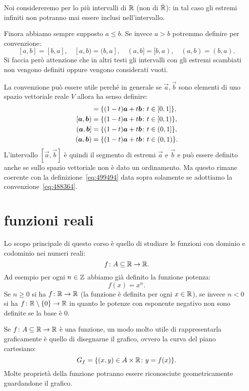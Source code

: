 Noi considereremo per lo più intervalli di $\mathbb R$ (non di $\bar {\mathbb R}$): in tal
caso gli estremi infiniti non potranno mai essere inclusi nell'intervallo.

Finora abbiamo sempre supposto $a \le b$.
Se invece $a>b$ potremmo definire per convenzione:
\begin{equation}\label{eq:488364}
  [a,b] = [b,a], \quad
  [a,b) = (b,a], \quad
  (a,b] = [b,a), \quad
  (a,b) = (b,a).
\end{equation}
Si faccia però attenzione che in altri testi gli intervalli con gli estremi
scambiati non vengono definiti oppure vengono considerati vuoti.

La convenzione può essere utile perché in generale se $\vec a, \vec b$ sono
elementi di uno spazio vettoriale reale $V$ allora ha senso
definire:
\begin{align*}
    [\vec a,\vec b] &= \ENCLOSE{(1-t)\vec a + t \vec b\colon t\in [0,1]},\\
    [\vec a,\vec b) &= \ENCLOSE{(1-t)\vec a + t \vec b\colon t\in [0,1)},\\
    (\vec a,\vec b] &= \ENCLOSE{(1-t)\vec a + t \vec b\colon t\in (0,1]},\\
    (\vec a,\vec b) &= \ENCLOSE{(1-t)\vec a + t \vec b\colon t\in (0,1)}.
\end{align*}
L'intervallo $[\vec a,\vec b]$ è quindi il segmento di estremi
$\vec a$ e $\vec b$ e può essere definito anche se sullo spazio
vettoriale non è dato un ordinamento.
Ma questo rimane coerente con la definizione~\eqref{eq:499494}
data sopra solamente se adottiamo la convenzione~\eqref{eq:488364}.


\section{funzioni reali}

Lo scopo principale di questo corso è quello di studiare le
funzioni con dominio e codominio nei numeri reali:
\[
  f \colon A \subseteq \mathbb R \to \mathbb R.
\]
Ad esempio per ogni $n\in \mathbb Z$ abbiamo già definito la funzione
potenza:
\[
  f(x) = x^n.
\]
Se $n\ge 0$ si ha $f\colon \mathbb R \to \mathbb R$ (la funzione è definita
per ogni $x\in \mathbb R$), se invece $n<0$ si ha
$f\colon \mathbb R\setminus{\left\{ 0 \right\}}\to \mathbb R$ in quanto le potenze
con esponente negativo non sono definite se la base è $0$.

Se $f\colon A \subseteq \mathbb R\to \mathbb R$ è una funzione, un modo molto
utile di rappresentarla graficamente è quello di disegnarne il
grafico, ovvero la curva del piano cartesiano:
\[
   G_f = {\left\{ (x,y)\in A\times \mathbb R\colon y = f(x) \right\}}.
\]
Molte proprietà della funzione potranno essere riconosciute
geometricamente guardandone il grafico.

